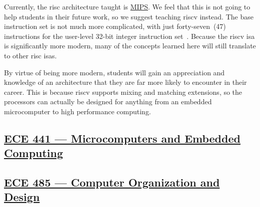 Currently, the \Gls{risc} architecture taught is \href{https://en.wikipedia.org/wiki/MIPS_architecture}{MIPS}.
We feel that this is not going to help students in their future work, so we suggest teaching \Gls{riscv} instead.
The base instruction set is not much more complicated, with just forty-seven~(47) instructions for the user-level 32-bit integer instruction set~\cite[pp.~9--26]{riscvISASpec}.
Because the \Gls{riscv} \Gls{isa} is significantly more modern, many of the concepts learned here will still translate to other \Gls{risc} \Glspl{isa}.

By virtue of being more modern, students will gain an appreciation and knowledge of an architecture that they are far more likely to encounter in their career.
This is because \Gls{riscv} supports mixing and matching extensions, so the processors can actually be designed for anything from an embedded microcomputer to high performance computing.

\subsection{\href{http://bulletin.iit.edu/search/?P=ECE 441}{ECE 441 --- Microcomputers and Embedded Computing}}\label{sec:ECE_441}

\subsection{\href{http://bulletin.iit.edu/search/?P=ECE 485}{ECE 485 --- Computer Organization and Design}}\label{sec:ECE_485}

